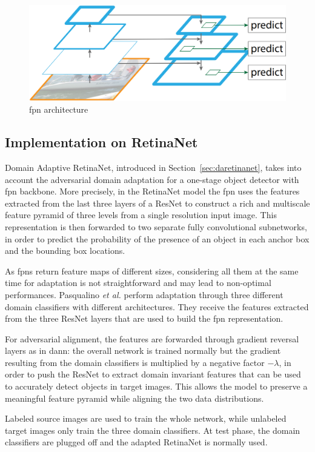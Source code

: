 \documentclass[%
    corpo=12pt,
    twoside,
    stile=classica,   
    tipotesi=magistrale,
    evenboxes,
    english,
	numerazioneromana,
]{toptesi}
\begin{document}
\begin{figure}[ht]
	\centering
	\includegraphics[width=.6\linewidth]{imgs/fpn.png}
	\caption{\Gls{fpn} architecture\cite{chen2018domain}}
	\label{fig:fpn}
\end{figure}

\subsection{Implementation on RetinaNet}
Domain Adaptive RetinaNet, introduced in Section~\ref{sec:daretinanet}, takes into account the adversarial domain adaptation for a one-stage object detector with \gls{fpn} backbone. More precisely, in the RetinaNet model the \gls{fpn} uses the features extracted from the last three layers of a ResNet to construct a rich and multiscale feature pyramid of three levels from a single resolution input image. This representation is then forwarded to two separate fully convolutional subnetworks, in order to predict the probability of the presence of an object in each anchor box and the bounding box locations.

\bigskip
As \glspl{fpn} return feature maps of different sizes, considering all them at the same time for adaptation is not straightforward and may lead to non-optimal performances. Pasqualino \textit{et al.}\cite{pasqualino2020unsupervised} perform adaptation through three different domain classifiers with different architectures. They receive the features extracted from the three ResNet layers that are used to build the \gls{fpn} representation.

For adversarial alignment, the features are forwarded through gradient reversal layers as in \gls{dann}: the overall network is trained normally but the gradient resulting from the domain classifiers is multiplied by a negative factor $-\lambda$, in order to push the ResNet to extract domain invariant features that can be used to accurately detect objects in target images. This allows the model to preserve a meaningful feature pyramid while aligning the two data distributions.


Labeled source images are used to train the whole network, while unlabeled target images only train the three domain classifiers. At test phase, the domain classifiers are plugged off and the adapted RetinaNet is normally used.
\end{document}
